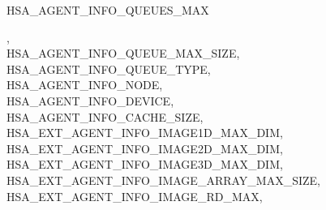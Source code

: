 \documentclass[final,oneside]{book}
\newcommand{\reftyp}[1]{#1}
\newcommand{\refenu}[1]{\reftyp{#1}}
\newenvironment{mylongtable}{\rowcolors{0}{lightgray}{lightgray}\longtable} {
\endlongtable}
\begin{document}
\begin{mylongtable}{@{}p{\textwidth}}
\hspace{1.7em}\hypertarget{group__agentinfo_1gga39d0684207d95717d96319573b3e4a42a06ac2144155abb87646396b0ac2c61f4}{\refenu{HSA_\-AGENT_\-INFO_\-QUEUES_\-MAX}},\\
\hspace{1.7em}\hypertarget{group__agentinfo_1gga39d0684207d95717d96319573b3e4a42acc88a2cb095e69df180ebee7aeb68c81}{\refenu{HSA_\-AGENT_\-INFO_\-QUEUE_\-MAX_\-SIZE}},\\
\hspace{1.7em}\hypertarget{group__agentinfo_1gga39d0684207d95717d96319573b3e4a42a46149fa502a210835171e0b66e16f988}{\refenu{HSA_\-AGENT_\-INFO_\-QUEUE_\-TYPE}},\\
\hspace{1.7em}\hypertarget{group__agentinfo_1gga39d0684207d95717d96319573b3e4a42a7e08d2bf6acfce669da4e810d3f7f28a}{\refenu{HSA_\-AGENT_\-INFO_\-NODE}},\\
\hspace{1.7em}\hypertarget{group__agentinfo_1gga39d0684207d95717d96319573b3e4a42a04660b9d69768cad7a7474310436ce88}{\refenu{HSA_\-AGENT_\-INFO_\-DEVICE}},\\
\hspace{1.7em}\hypertarget{group__agentinfo_1gga39d0684207d95717d96319573b3e4a42ae7fe21528c215249472e5836631759f4}{\refenu{HSA_\-AGENT_\-INFO_\-CACHE_\-SIZE}},\\
\hspace{1.7em}\hypertarget{group__agentinfo_1gga39d0684207d95717d96319573b3e4a42a9ea2d28a16c614f0cac5446c8a09aa15}{\refenu{HSA_\-EXT_\-AGENT_\-INFO_\-IMAGE1D_\-MAX_\-DIM}},\\
\hspace{1.7em}\hypertarget{group__agentinfo_1gga39d0684207d95717d96319573b3e4a42ae4adcd694c486dfd67e2d00f11fc2425}{\refenu{HSA_\-EXT_\-AGENT_\-INFO_\-IMAGE2D_\-MAX_\-DIM}},\\
\hspace{1.7em}\hypertarget{group__agentinfo_1gga39d0684207d95717d96319573b3e4a42ac7e605dad393b6f73722cb5c86a968e1}{\refenu{HSA_\-EXT_\-AGENT_\-INFO_\-IMAGE3D_\-MAX_\-DIM}},\\
\hspace{1.7em}\hypertarget{group__agentinfo_1gga39d0684207d95717d96319573b3e4a42aeb37004b5bac60cd22b069dde35888f9}{\refenu{HSA_\-EXT_\-AGENT_\-INFO_\-IMAGE_\-ARRAY_\-MAX_\-SIZE}},\\
\hspace{1.7em}\hypertarget{group__agentinfo_1gga39d0684207d95717d96319573b3e4a42a1aeb019ae81f2f942f27b674ed88168d}{\refenu{HSA_\-EXT_\-AGENT_\-INFO_\-IMAGE_\-RD_\-MAX}},\\

\end{mylongtable}
\end{document}
